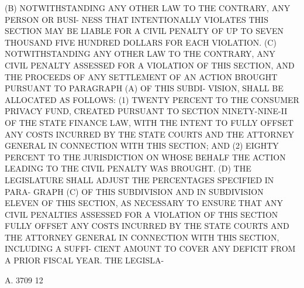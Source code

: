    (B) NOTWITHSTANDING ANY OTHER LAW TO THE CONTRARY, ANY PERSON OR BUSI-
 NESS  THAT INTENTIONALLY VIOLATES THIS SECTION MAY BE LIABLE FOR A CIVIL
 PENALTY OF UP TO SEVEN THOUSAND FIVE HUNDRED DOLLARS FOR EACH VIOLATION.
   (C) NOTWITHSTANDING ANY OTHER LAW TO THE CONTRARY, ANY  CIVIL  PENALTY
 ASSESSED  FOR  A  VIOLATION  OF  THIS  SECTION,  AND THE PROCEEDS OF ANY
 SETTLEMENT OF AN ACTION BROUGHT PURSUANT TO PARAGRAPH (A) OF THIS SUBDI-
 VISION, SHALL BE ALLOCATED AS FOLLOWS:
   (1) TWENTY PERCENT TO THE CONSUMER PRIVACY FUND, CREATED  PURSUANT  TO
 SECTION  NINETY-NINE-II  OF  THE  STATE  FINANCE LAW, WITH THE INTENT TO
 FULLY OFFSET ANY COSTS INCURRED BY THE STATE  COURTS  AND  THE  ATTORNEY
 GENERAL IN CONNECTION WITH THIS SECTION; AND
   (2)  EIGHTY  PERCENT  TO  THE  JURISDICTION ON WHOSE BEHALF THE ACTION
 LEADING TO THE CIVIL PENALTY WAS BROUGHT.
   (D) THE LEGISLATURE SHALL ADJUST THE PERCENTAGES  SPECIFIED  IN  PARA-
 GRAPH (C) OF THIS SUBDIVISION AND IN SUBDIVISION ELEVEN OF THIS SECTION,
 AS NECESSARY TO ENSURE THAT ANY CIVIL PENALTIES ASSESSED FOR A VIOLATION
 OF  THIS SECTION FULLY OFFSET ANY COSTS INCURRED BY THE STATE COURTS AND
 THE ATTORNEY GENERAL IN CONNECTION WITH THIS SECTION, INCLUDING A SUFFI-
 CIENT AMOUNT TO COVER ANY DEFICIT FROM A PRIOR FISCAL YEAR. THE LEGISLA-

 A. 3709                            12
 
